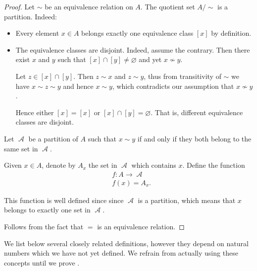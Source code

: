 \begin{proof}
   Let \( {\sim} \) be an equivalence relation on \( A \). The quotient set \( A / {\sim} \) is a partition. Indeed:
  \begin{itemize}
    \item Every element \( x \in A \) belongs exactly one equivalence class \( [x] \) by definition.

    \item The equivalence classes are disjoint. Indeed, assume the contrary. Then there exist \( x \) and \( y \) such that \( [x] \cap [y] \neq \varnothing \) and yet \( x \not\sim y \).

    Let \( z \in [x] \cap [y] \). Then \( z \sim x \) and \( z \sim y \), thus from transitivity of \( {\sim} \) we have \( x \sim z \sim y \) and hence \( x \sim y \), which contradicts our assumption that \( x \not\sim y \).

    Hence either \( [x] = [x] \) or \( [x] \cap [y] = \varnothing \). That is, different equivalence classes are disjoint.
  \end{itemize}

   Let \( \mscrA \) be a partition of \( A \) such that \( x \sim y \) if and only if they both belong to the same set in \( \mscrA \).

  Given \( x \in A \), denote by \( A_x \) the set in \( \mscrA \) which contains \( x \). Define the function
  \begin{equation*}
    \begin{aligned}
      &f: A \to \mscrA \\
      &f(x) = A_x.
    \end{aligned}
  \end{equation*}

  This function is well defined since since \( \mscrA \) is a partition, which means that \( x \) belongs to exactly one set in \( \mscrA \).

   Follows from the fact that \( = \) is an equivalence relation.
\end{proof}

\begin{remark}\label{rem:forward_references_to_natural_numbers_zfc}
  We list below several closely related definitions, however they depend on natural numbers which we have not yet defined. We refrain from actually using these concepts until we prove .
\end{remark}

